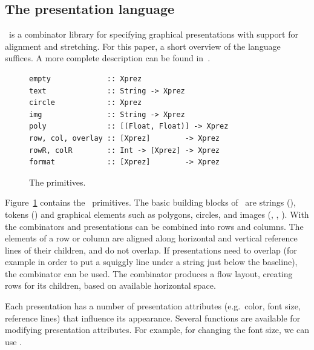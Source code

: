 \documentclass[12pt]{article}
\begin{document}
\subsection{The {\Xprez} presentation language} \label{sect:xprez}

\Xprez\ is a combinator library for specifying graphical presentations with support for alignment and stretching. For this paper, a short overview of the language suffices. A more complete description can be found in~\cite{schrage04Proxima}.

\begin{figure}
\begin{footnotesize}
\begin{center}
\begin{footnotesize}
\begin{verbatim}
empty             :: Xprez
text              :: String -> Xprez             
circle            :: Xprez                       
img               :: String -> Xprez             
poly              :: [(Float, Float)] -> Xprez 
row, col, overlay :: [Xprez]        -> Xprez          
rowR, colR        :: Int -> [Xprez] -> Xprez   
format            :: [Xprez]        -> Xprez
\end{verbatim}
\end{footnotesize}
\caption{The {\Xprez} primitives.} \label{fig:xprezPrim} 
\end{center}
\end{footnotesize}
\end{figure}

Figure~\ref{fig:xprezPrim} contains the \Xprez\ primitives. The basic building blocks of \Xprez\ are strings (), tokens () and graphical elements such as polygons, circles, and images (, , ). With the combinators  and  presentations can be combined into rows and columns. The elements of a row or column are aligned along horizontal and vertical reference lines of their children, and do not overlap. If presentations need to overlap (for example in order to put a squiggly line under a string just below the baseline), the  combinator can be used. The  combinator produces a flow layout, creating rows for its children, based on available horizontal space.

Each presentation has a number of presentation attributes (e.g.\ color, font size, reference lines) that influence its appearance. Several functions are available for modifying presentation attributes. For example, for changing the font size, we can use . 
\end{document}
